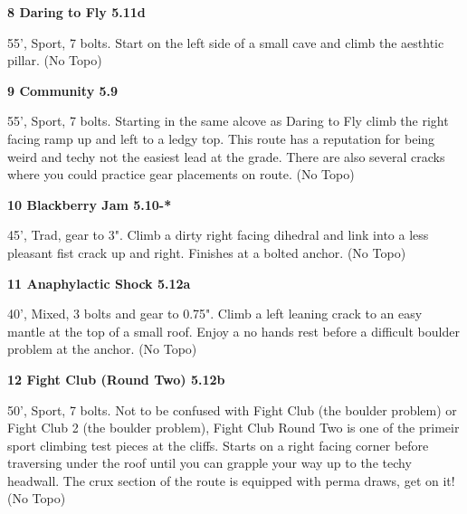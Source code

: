 \begin{multicols}{2}
\needspace{1.5cm}
\label{rt:Daring to Fly}
\colorbox{RoyalBlue!20}{
\parbox{0.95\linewidth}{
\textbf{
8 Daring to Fly 5.11d  
}}}
\begin{adjustwidth}{0.5cm}{}			
55', Sport, 7 bolts. Start on the left side of a small cave and climb the aesthtic pillar.
  (No Topo)
\end{adjustwidth}




\needspace{1.5cm}
\label{rt:Community}
\colorbox{green!20}{
\parbox{0.95\linewidth}{
\textbf{
9 Community 5.9  
}}}
\begin{adjustwidth}{0.5cm}{}			
55', Sport, 7 bolts. Starting in the same alcove as Daring to Fly climb the right facing ramp up and left to a ledgy top. This route has a reputation for being weird and techy not the easiest lead at the grade. There are also several cracks where you could practice gear placements on route.
  (No Topo)
\end{adjustwidth}




\needspace{1.5cm}
\label{rt:Blackberry Jam}
\colorbox{RoyalBlue!20}{
\parbox{0.95\linewidth}{
\textbf{
10 Blackberry Jam 5.10-*  
}}}
\begin{adjustwidth}{0.5cm}{}			
45', Trad, gear to 3". Climb a dirty right facing dihedral and link into a less pleasant fist crack up and right. Finishes at a bolted anchor.
  (No Topo)
\end{adjustwidth}




\needspace{1.5cm}
\label{rt:Anaphylactic Shock}
\colorbox{Goldenrod!50}{
\parbox{0.95\linewidth}{
\textbf{
11 Anaphylactic Shock 5.12a  
}}}
\begin{adjustwidth}{0.5cm}{}			
40', Mixed, 3 bolts and gear to 0.75". Climb a left leaning crack to an easy mantle at the top of a small roof. Enjoy a no hands rest before a difficult boulder problem at the anchor.
  (No Topo)
\end{adjustwidth}




\needspace{1.5cm}
\label{rt:Fight Club (Round Two)}
\colorbox{Goldenrod!50}{
\parbox{0.95\linewidth}{
\textbf{
12 Fight Club (Round Two) 5.12b  
}}}
\begin{adjustwidth}{0.5cm}{}			
50', Sport, 7 bolts. Not to be confused with Fight Club (the boulder problem) or Fight Club 2 (the boulder problem), Fight Club Round Two is one of the primeir sport climbing test pieces at the cliffs. Starts on a right facing corner before traversing under the roof until you can grapple your way up to the techy headwall. The crux section of the route is equipped with perma draws, get on it!
  (No Topo)
\end{adjustwidth}





\end{multicols}
